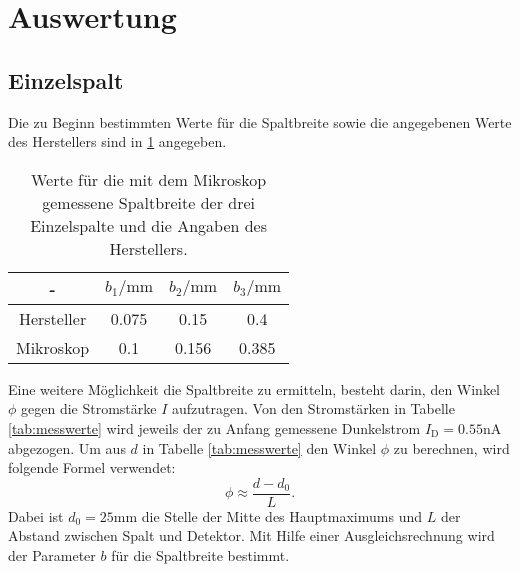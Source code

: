 \section{Auswertung}
\label{sec:Auswertung}

\subsection{Einzelspalt}
Die zu Beginn bestimmten Werte für die Spaltbreite sowie die angegebenen Werte des Herstellers sind in \ref{tab:b} angegeben.

\begin{table}
  \caption{Werte für die mit dem Mikroskop gemessene Spaltbreite der drei Einzelspalte und die Angaben des Herstellers.}
  \centering
  \label{tab:b}
  \begin{tabular}{c c c c}
    \toprule
   - & $b_1/\si{\milli\meter}$ & $b_2/\si{\milli\meter}$ & $b_3/\si{\milli\meter}$ \\
   \midrule
   Hersteller & 0.075 & 0.15 & 0.4 \\
   Mikroskop & 0.1 & 0.156 &  0.385\\
   \bottomrule
   \end{tabular}
\end{table}

Eine weitere Möglichkeit die Spaltbreite zu ermitteln, besteht darin, den Winkel $\phi$ gegen die Stromstärke $I$ aufzutragen. Von den Stromstärken in Tabelle \ref{tab:messwerte} wird jeweils der zu Anfang gemessene Dunkelstrom $I_\mathrm{D}=0.55\si{\nano\ampere}$ abgezogen. Um aus $d$ in Tabelle \ref{tab:messwerte} den Winkel $\phi$ zu berechnen, wird folgende Formel verwendet:
\begin{equation}
  \label{eqn:winkel}
  \phi \approx \frac{d-d_0}{L}.
\end{equation}
Dabei ist $d_0=25 \si{\milli\meter}$ die Stelle der Mitte des Hauptmaximums und $L$ der Abstand zwischen Spalt und Detektor.
Mit Hilfe einer Ausgleichsrechnung wird der Parameter $b$ für die Spaltbreite bestimmt.


